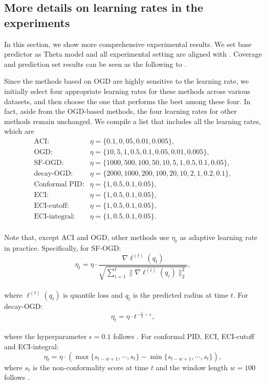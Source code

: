 \subsection{More details on learning rates in the experiments}
\label{More details on learning rates in the experiments}
In this section, we show more comprehensive experimental results. We set base predictor as Theta model and all experimental setting are aligned with . Coverage and prediction set results can be seen as the following  to .

Since the methods based on OGD are highly sensitive to the learning rate, we initially select four appropriate learning rates for these methods across various datasets, and then choose the one that performs the best among these four. In fact, aside from the OGD-based methods, the four learning rates for other methods remain unchanged. We compile a list that includes all the learning rates, which are 
$$\begin{aligned}
\text{ACI}:&\eta = \{0.1, 0,05, 0.01, 0.005\}, \\
\text{OGD}:&\eta = \{10, 5, 1, 0.5, 0.1, 0.05, 0.01, 0.005\}, \\
\text{SF-OGD}:&\eta = \{1000, 500, 100, 50, 10, 5, 1, 0.5, 0.1, 0.05\}, \\
\text{decay-OGD}:&\eta = \{2000, 1000, 200, 100, 20, 10, 2, 1, 0.2, 0.1\}, \\
\text{Conformal PID}:&\eta = \{1, 0.5, 0.1, 0.05\}, \\
\text{ECI}:&\eta = \{1, 0.5, 0.1, 0.05\}, \\
\text{ECI-cutoff}:&\eta = \{1, 0.5, 0.1, 0.05\}, \\
\text{ECI-integral}:&\eta = \{1, 0.5, 0.1, 0.05\}. \\
\end{aligned}$$


Note that, except ACI and OGD, other methods use $\eta_t$ as adaptive learning rate in practice. Specifically, for SF-OGD:
$$\eta_t = \eta \cdot \frac{\nabla \ell^{(t)}(q_t)}{\sqrt{\sum_{i=1}^{t} \|\nabla \ell^{(i)}(q_i)\|_2^2}}
,$$
\\
where $\ell^{(t)}(q_t)$ is quantile loss and $q_t$ is the predicted radius at time $t$. For decay-OGD:
$$\eta_t = \eta \cdot t^{-\frac{1}{2}-\epsilon},$$
\\
where the hyperparameter $\epsilon=0.1$ follows \citet{angelopoulos2024online}. For conformal PID, ECI, ECI-cutoff and ECI-integral: 
$$\eta_t = \eta \cdot (\max\{s_{t-w+1},\cdots,s_t\}-\min\{s_{t-w+1},\cdots,s_t\}),$$
where $s_t$ is the non-conformality score at time $t$ and the window length $w=100$ follows \citet{pid_angelopoulos2024conformal}.


